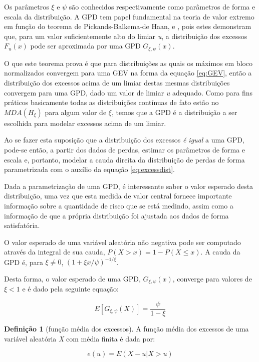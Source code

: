 \documentclass[1p]{elsarticle}
\theoremstyle{definition}
\newtheorem{defi}[teor]{Definição}
\begin{document}
Os parâmetros $\xi$ e $\psi$ são conhecidos respectivamente como parâmetros de forma e escala da distribuição. A GPD tem papel fundamental na teoria de valor extremo em função do teorema de Pickands-Balkema-de Haan, \cite{Pickands1975} e \cite{Balkema1974}, pois estes demonstram que, para um valor suficientemente alto do limiar \emph{u}, a distribuição dos excessos $F_u(x)$ pode ser aproximada por uma GPD $G_{\xi,\psi}(x)$.

O que este teorema prova é que para distribuições as quais os máximos em bloco normalizados convergem para uma GEV na forma da equação \eqref{eq:GEV}, então a distribuição dos excessos acima de um limiar destas mesmas distribuições convergem para uma GPD, dado um valor de limiar \emph{u} adequado. Como para fins práticos basicamente todas as distribuições contínuas de fato estão no $MDA(H_\xi)$ para algum valor de $\xi$, temos que a GPD é a distribuição a ser escolhida para modelar excessos acima de um limiar.

Ao se fazer esta suposição que a distribuição dos excessos \emph{é igual} a uma GPD, pode-se então, a partir dos dados de perdas, estimar os parâmetros de forma e escala e, portanto, modelar a cauda direita da distribuição de perdas de forma parametrizada com o auxílio da equação \eqref{eq:excessdist}. 


Dada a parametrização de uma GPD, é interessante saber o valor esperado desta distribuição, uma vez que esta medida de valor central fornece importante informação sobre a quantidade de risco que se está medindo, assim como a informação de que a própria distribuição foi ajustada aos dados de forma satisfatória.

O valor esperado de uma variável aleatória não negativa pode ser computado através da integral de sua cauda, $P(X>x) = 1-P(X \leq x)$. A cauda da GPD é, para $\xi \neq 0$, $\left(1+\xi x / \psi \right)^{-1/ \xi}$.

Desta forma, o valor esperado de uma GPD, $G_{\xi,\psi}(x)$, converge para valores de $\xi<1$ e é dado pela seguinte equação:

\begin{equation}
\label{eq:meanGPD}
E\left[G_{\xi,\psi} (X) \right]=\frac{\psi}{1-\xi}
\end{equation}


\begin{defi}[função média dos excessos]
	\label{defi:meanexcess}
	A função média dos excessos de uma variável aleatória \emph{X} com média finita é dada por:

	\begin{equation}
	\label{eq:meanexcess}
	e(u)=E\left(X-u | X > u\right)
	\end{equation}
\end{defi}
\end{document}
